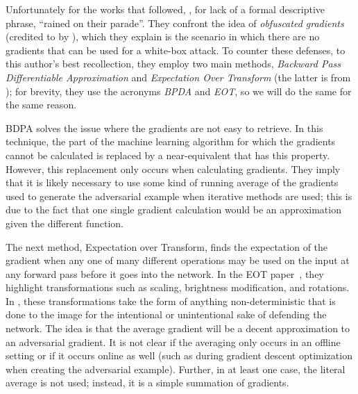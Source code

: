 Unfortunately for the works that followed, \cite{athalye2018obfuscated}, for lack of a formal
descriptive phrase, ``rained on their parade''. They confront the idea of \textit{obfuscated
gradients} (credited to \cite{10.1145/3052973.3053009} by \cite{athalye2018obfuscated}), which they
explain is the scenario in which there are no gradients that can be used for a white-box attack. To
counter these defenses, to this author's best recollection, they employ two main methods,
\textit{Backward Pass Differentiable Approximation} and \textit{Expectation Over Transform} (the
latter is from \cite{athalye2018synthesizing}); for brevity, they use the acronyms \textit{BPDA} and
\textit{EOT}, so we will do the same for the same reason.

BDPA solves the issue where the gradients are not easy to retrieve. In this technique, the part of
the machine learning algorithm for which the gradients cannot be calculated is replaced by a
near-equivalent that has this property. However, this replacement only occurs when calculating
gradients. They imply that it is likely necessary to use some kind of running average of the
gradients used to generate the adversarial example when iterative methods are used; this is due to
the fact that one single gradient calculation would be an approximation given the different
function.

The next method, Expectation over Transform, finds the expectation of the gradient when any one of
many different operations may be used on the input at any forward pass before it goes into the
network. In the EOT paper~\cite{athalye2018synthesizing}, they highlight transformations such as
scaling, brightness modification, and rotations. In \cite{athalye2018obfuscated}, these
transformations take the form of anything non-deterministic that is done to the image for the
intentional or unintentional sake of defending the network. The idea is that the average gradient
will be a decent approximation to an adversarial gradient. It is not clear if the averaging only
occurs in an offline setting or if it occurs online as well (such as during gradient descent
optimization when creating the adversarial example). Further, in at least one case, the literal
average is not used; instead, it is a simple summation of gradients.

